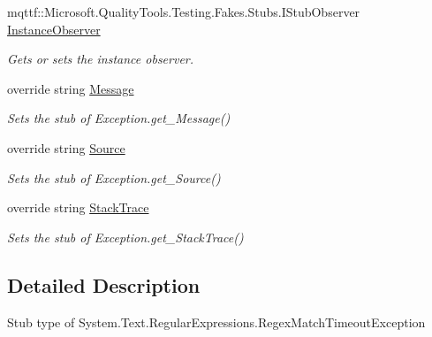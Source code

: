 \begin{DoxyCompactItemize}
mqttf\-::\-Microsoft.\-Quality\-Tools.\-Testing.\-Fakes.\-Stubs.\-I\-Stub\-Observer \hyperlink{class_system_1_1_text_1_1_regular_expressions_1_1_fakes_1_1_stub_regex_match_timeout_exception_ab72cbe9c2f70f4513c9889cb88fdecbe}{Instance\-Observer}
\begin{DoxyCompactList}\small\item\em Gets or sets the instance observer.\end{DoxyCompactList}\item 
override string \hyperlink{class_system_1_1_text_1_1_regular_expressions_1_1_fakes_1_1_stub_regex_match_timeout_exception_a8cf0b189262915fc81f748650607583c}{Message}
\begin{DoxyCompactList}\small\item\em Sets the stub of Exception.\-get\-\_\-\-Message()\end{DoxyCompactList}\item 
override string \hyperlink{class_system_1_1_text_1_1_regular_expressions_1_1_fakes_1_1_stub_regex_match_timeout_exception_a1d27614b3f4c8e12fdbbba65c8af46a6}{Source}
\begin{DoxyCompactList}\small\item\em Sets the stub of Exception.\-get\-\_\-\-Source()\end{DoxyCompactList}\item 
override string \hyperlink{class_system_1_1_text_1_1_regular_expressions_1_1_fakes_1_1_stub_regex_match_timeout_exception_adfff948490059ba701aa901d1bf30e9a}{Stack\-Trace}
\begin{DoxyCompactList}\small\item\em Sets the stub of Exception.\-get\-\_\-\-Stack\-Trace()\end{DoxyCompactList}\end{DoxyCompactItemize}


\subsection{Detailed Description}
Stub type of System.\-Text.\-Regular\-Expressions.\-Regex\-Match\-Timeout\-Exception



